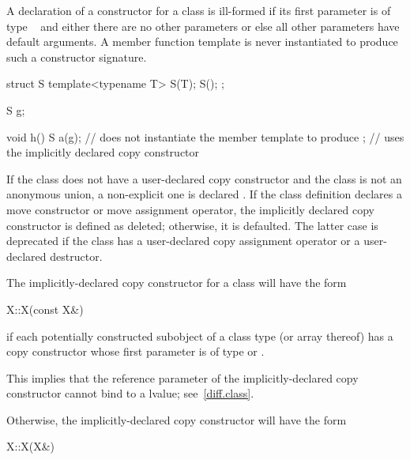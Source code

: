 \pnum
A declaration of a constructor for a class
is ill-formed if its first parameter is of type
\cv{}~
and either there are no other parameters or else all other parameters have
default arguments.
A member function template is never instantiated to
produce such a constructor signature.
\begin{example}
\begin{codeblock}
struct S {
  template<typename T> S(T);
  S();
};

S g;

void h() {
  S a(g);           // does not instantiate the member template to produce ;
                    // uses the implicitly declared copy constructor
}
\end{codeblock}
\end{example}

\pnum
If the class does not have a user-declared copy constructor
and the class is not an anonymous union,
a non-explicit one is declared .
If the class definition declares a move
constructor or move assignment operator, the implicitly declared copy
constructor is defined as deleted; otherwise, it is
defaulted.
The latter case is deprecated if the class has a user-declared copy assignment
operator or a user-declared destructor.

\pnum
The implicitly-declared copy constructor for a class
will have the form
\begin{codeblock}
X::X(const X&)
\end{codeblock}
if each potentially constructed subobject of a class type
(or array thereof)
has a copy constructor whose first parameter is of type
or
.
\begin{footnote}
This implies that the reference parameter of the
implicitly-declared copy constructor
cannot bind to a
lvalue; see~\ref{diff.class}.
\end{footnote}
Otherwise, the implicitly-declared copy constructor will have the form
\begin{codeblock}
X::X(X&)
\end{codeblock}

